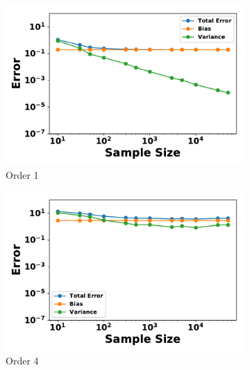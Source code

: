 \documentclass[letterpaper]{article} %
\begin{document}
        \begin{figure}[p]
          \centering
          \begin{subfigure}[b]{0.245\textwidth}
              \centering
              \includegraphics[width=\textwidth]{./HBM_Error_vs_Samples_Order1-eps-converted-to.pdf}
              \caption{Order 1}
          \end{subfigure}
          \begin{subfigure}[b]{0.245\textwidth}
              \centering
              \includegraphics[width=\textwidth]{./HBM_Error_vs_Samples_Order4-eps-converted-to.pdf}
              \caption{Order 4}
          \end{subfigure}
          \begin{subfigure}[b]{0.245\textwidth}
              \centering

\end{subfigure}
\end{figure}
\end{document}
